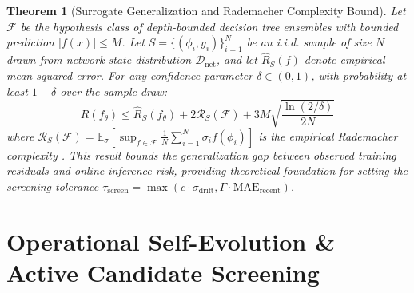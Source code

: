 \documentclass[pdflatex,sn-mathphys-num]{sn-jnl}
\theoremstyle{thmstyleone}
\newtheorem{theorem}{Theorem}
\theoremstyle{thmstyletwo}
\theoremstyle{thmstylethree}
\begin{document}
\begin{theorem}[Surrogate Generalization and Rademacher Complexity Bound]
Let $\mathcal{F}$ be the hypothesis class of depth-bounded decision tree ensembles with bounded prediction $|f(x)| \le M$. Let $S = \{(\phi_i, y_i)\}_{i=1}^N$ be an i.i.d. sample of size $N$ drawn from network state distribution $\mathcal{D}_{\mathrm{net}}$, and let $\hat{R}_S(f)$ denote empirical mean squared error. For any confidence parameter $\delta \in (0, 1)$, with probability at least $1 - \delta$ over the sample draw:
\begin{equation}
R(f_\theta) \le \hat{R}_S(f_\theta) + 2 \mathcal{R}_S(\mathcal{F}) + 3 M \sqrt{\frac{\ln(2 / \delta)}{2 N}}
\end{equation}
where $\mathcal{R}_S(\mathcal{F}) = \mathbb{E}_\sigma \left[ \sup_{f \in \mathcal{F}} \frac{1}{N} \sum_{i=1}^N \sigma_i f(\phi_i) \right]$ is the empirical Rademacher complexity \cite{bartlett2002rademacher}. This result bounds the generalization gap between observed training residuals and online inference risk, providing theoretical foundation for setting the screening tolerance $\tau_{\mathrm{screen}} = \max(c \cdot \sigma_{\mathrm{drift}}, \Gamma \cdot \mathrm{MAE}_{\mathrm{recent}})$.
\end{theorem}

\section{Operational Self-Evolution \& Active Candidate Screening}\label{sec6}
\end{document}
